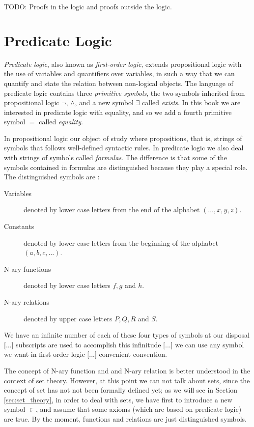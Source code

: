 {\color{red} TODO: Proofs in the logic and proofs outside the logic.}

%
%

\section{Predicate Logic}
\label{sec:predicate_logic}

\emph{Predicate logic}, also known as \emph{first-order logic}, extends propositional logic with the use of variables and quantifiers over variables, in such a way that we can quantify and state the relation between non-logical objects. The language of predicate logic contains three \emph{primitive symbols}, the two symbols inherited from propositional logic $\lnot$, $\land$, and a new symbol $\exists$ called \emph{exists}. In this book we are interested in predicate logic with equality, and so we add a fourth primitive symbol $=$ called \emph{equality}.

In propositional logic our object of study where propositions, that is, strings of symbols that follows well-defined syntactic rules. In predicate logic we also deal with strings of symbols called \emph{formulas}. The difference is that some of the symbols contained in formulas are distinguished because they play a special role. The distinguished symbols are :

\vskip 0.25cm

\begin{description}
\item [Variables] denoted by lower case letters from the end of the alphabet $(\ldots, x, y, z)$.
\item [Constants] denoted by lower case letters from the beginning of the alphabet $(a, b, c, \ldots)$. 
\item [N-ary functions] denoted by lower case letters $f, g$ and $h$.
\item [N-ary relations] denoted by upper case letters $P, Q, R$ and $S$.
\end{description}

\vskip 0.25cm

{\color{red} We have an infinite number of each of these four types of symbols at our disposal [...] subscripts are used to accomplish this infinitude [...] we can use any symbol we want in first-order logic [...] convenient convention.}

The concept of N-ary function and and N-ary relation is better understood in the context of set theory. However, at this point we can not talk about sets, since the concept of set has not not been formally defined yet; as we will see in Section \ref{sec:set_theory}, in order to deal with sets, we have first to introduce a new symbol $\in$, and assume that some axioms (which are based on predicate logic) are true. By the moment, functions and relations are just distinguished symbols.

